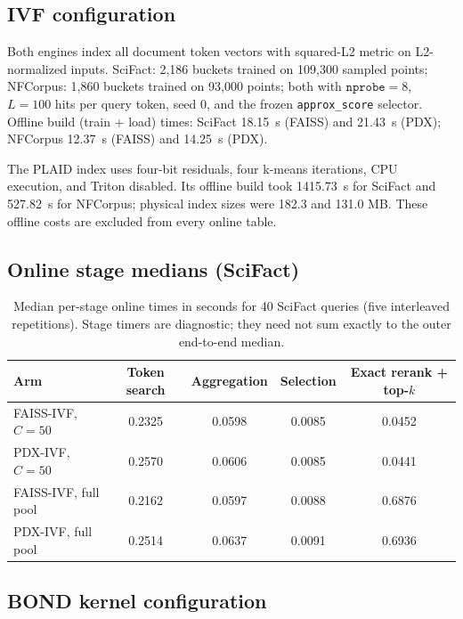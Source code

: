 \subsection{IVF configuration}

Both engines index all document token vectors with squared-L2 metric on
L2-normalized inputs. SciFact: 2{,}186 buckets trained on 109{,}300 sampled
points; NFCorpus: 1{,}860 buckets trained on 93{,}000 points; both with
$\texttt{nprobe} = 8$, $L = 100$ hits per query token, seed 0, and the frozen
\texttt{approx\_score} selector. Offline build (train + load) times:
SciFact \SI{18.15}{\second} (FAISS) and \SI{21.43}{\second} (PDX); NFCorpus
\SI{12.37}{\second} (FAISS) and \SI{14.25}{\second} (PDX).

The PLAID index uses four-bit residuals, four k-means iterations, CPU execution,
and Triton disabled. Its offline build took \SI{1415.73}{\second} for SciFact
and \SI{527.82}{\second} for NFCorpus; physical index sizes were 182.3 and
131.0 MB. These offline costs are excluded from every online table.

\subsection{Online stage medians (SciFact)}

\begin{table}[ht]
  \centering
  \caption{Median per-stage online times in seconds for 40 SciFact queries
    (five interleaved repetitions). Stage timers are diagnostic; they need not
    sum exactly to the outer end-to-end median.}
  \label{tab:stages}
  \small
  \begin{tabular}{@{}l S[table-format=1.4] S[table-format=1.4] S[table-format=1.4] S[table-format=1.4]@{}}
    \toprule
    Arm & {Token search} & {Aggregation} & {Selection} & {Exact rerank + top-$k$} \\
    \midrule
    FAISS-IVF, $C{=}50$  & 0.2325 & 0.0598 & 0.0085 & 0.0452 \\
    PDX-IVF,   $C{=}50$  & 0.2570 & 0.0606 & 0.0085 & 0.0441 \\
    FAISS-IVF, full pool & 0.2162 & 0.0597 & 0.0088 & 0.6876 \\
    PDX-IVF,   full pool & 0.2514 & 0.0637 & 0.0091 & 0.6936 \\
    \bottomrule
  \end{tabular}
\end{table}

\subsection{BOND kernel configuration}

